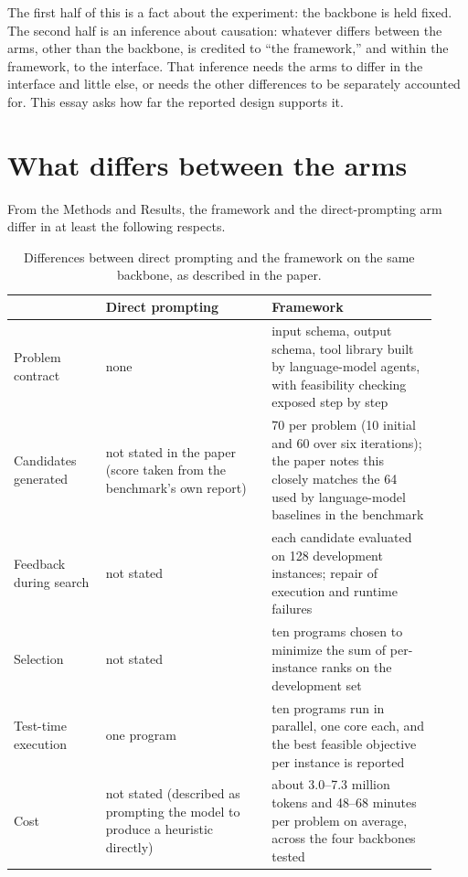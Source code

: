 \documentclass[11pt]{article}
\theoremstyle{definition}
\begin{document}
The first half of this is a fact about the experiment: the backbone is held fixed. The second half is an inference about causation: whatever differs between the arms, other than the backbone, is credited to ``the framework,'' and within the framework, to the interface. That inference needs the arms to differ in the interface and little else, or needs the other differences to be separately accounted for. This essay asks how far the reported design supports it.

\section{What differs between the arms}

From the Methods and Results, the framework and the direct-prompting arm differ in at least the following respects.

\begin{table}[h]
\centering
\caption{Differences between direct prompting and the framework on the same backbone, as described in the paper.}
\label{tab:arms}
\small
\begin{tabular}{p{0.2\linewidth}p{0.36\linewidth}p{0.36\linewidth}}
\toprule
 & Direct prompting & Framework \\
\midrule
Problem contract & none & input schema, output schema, tool library built by language-model agents, with feasibility checking exposed step by step \\
Candidates generated & not stated in the paper (score taken from the benchmark's own report) & 70 per problem (10 initial and 60 over six iterations); the paper notes this closely matches the 64 used by language-model baselines in the benchmark \\
Feedback during search & not stated & each candidate evaluated on 128 development instances; repair of execution and runtime failures \\
Selection & not stated & ten programs chosen to minimize the sum of per-instance ranks on the development set \\
Test-time execution & one program & ten programs run in parallel, one core each, and the best feasible objective per instance is reported \\
Cost & not stated (described as prompting the model to produce a heuristic directly) & about 3.0--7.3 million tokens and 48--68 minutes per problem on average, across the four backbones tested \\
\bottomrule
\end{tabular}
\end{table}
\end{document}
